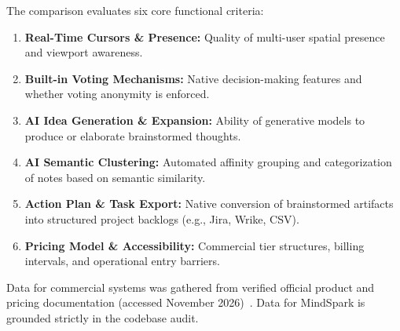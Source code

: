 The comparison evaluates six core functional criteria:
\begin{enumerate}
    \item \textbf{Real-Time Cursors \& Presence:} Quality of multi-user spatial presence and viewport awareness.
    \item \textbf{Built-in Voting Mechanisms:} Native decision-making features and whether voting anonymity is enforced.
    \item \textbf{AI Idea Generation \& Expansion:} Ability of generative models to produce or elaborate brainstormed thoughts.
    \item \textbf{AI Semantic Clustering:} Automated affinity grouping and categorization of notes based on semantic similarity.
    \item \textbf{Action Plan \& Task Export:} Native conversion of brainstormed artifacts into structured project backlogs (e.g., Jira, Wrike, CSV).
    \item \textbf{Pricing Model \& Accessibility:} Commercial tier structures, billing intervals, and operational entry barriers.
\end{enumerate}

Data for commercial systems was gathered from verified official product and pricing documentation (accessed November 2026)~\cite{miro_pricing,mural_pricing,klaxoon_pricing,figjam_pricing}. Data for MindSpark is grounded strictly in the codebase audit.

